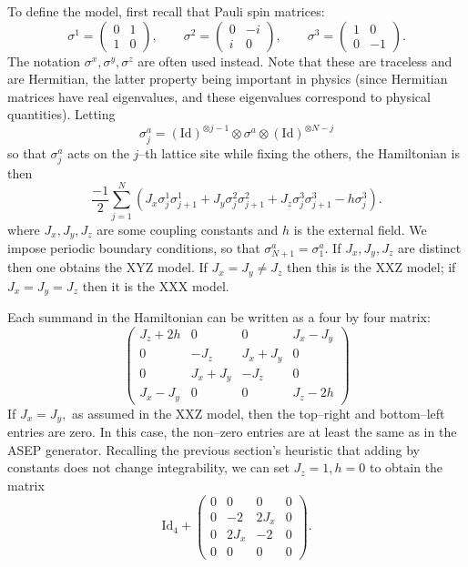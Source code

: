 \documentclass{ximera}
\begin{document}
To define the model, first recall that Pauli spin matrices:
\[
\sigma^1 = \left(\begin{array}{cc} 0 & 1 \\ 1 & 0 \end{array}\right), \quad \quad \sigma^2 = \left( \begin{array}{cc} 0 & -i \\ i & 0 \end{array}\right), \quad \quad \sigma^3 = \left( \begin{array}{cc} 1 & 0 \\ 0 & -1 \end{array}\right).
\]
The notation \(\sigma^x,\sigma^y,\sigma^z\) are often used instead. 
Note that these are traceless and are Hermitian, the latter property being important in physics (since
Hermitian matrices have real eigenvalues, and these eigenvalues correspond to physical quantities). 
Letting
\[
\sigma^a_j = (\mathrm{Id})^{\otimes j-1} \otimes \sigma^a \otimes (\mathrm{Id})^{\otimes N-j}
\] 
so that \(\sigma^a_j\) acts on the \(j\)--th lattice site while fixing the others, the Hamiltonian is then
\[
\frac{-1}{2}\sum_{j=1}^N \left( J_x \sigma^1_j \sigma^1_{j+1} + J_y \sigma^2_j \sigma^2_{j+1} + J_z \sigma^3_j\sigma^3_{j+1} - h\sigma^3_j\right).
\]
where \(J_x,J_y,J_z\) are some coupling constants and \(h\) is the external field. We impose periodic boundary
conditions, so that \(\sigma^a_{N+1}=\sigma^a_1.\) If \(J_x,J_y,J_z\) are distinct then one obtains the 
XYZ model. If \(J_x=J_y \neq J_z\) then this is the XXZ model; if \(J_x=J_y=J_z\) then it is the XXX model.

Each summand in the Hamiltonian can be written as a four by four matrix:
\[
\left(\begin{array}{cccc}
J_z + 2h & 0 & 0 & J_x-J_y \\
0 & -J_z & J_x + J_y & 0 \\
0 & J_x + J_y & -J_z & 0 \\
J_x - J_y & 0 & 0 & J_z-2h
\end{array}\right)
\]
If \(J_x=J_y,\) as assumed in the XXZ model, then the top--right and bottom--left entries are zero. In 
this case, the non--zero entries are at least the same as in the ASEP generator. Recalling the previous
section's heuristic that adding by constants does not change integrability, we can set \(J_z=1,h=0\) to
obtain the matrix
\[
\mathrm{Id}_4 + \left( \begin{array}{cccc}
0 & 0 & 0 & 0 \\
0 & -2 & 2J_x & 0 \\
0 & 2J_x & -2 & 0\\
0 & 0 & 0 & 0 
\end{array}\right).
\]
\end{document}
